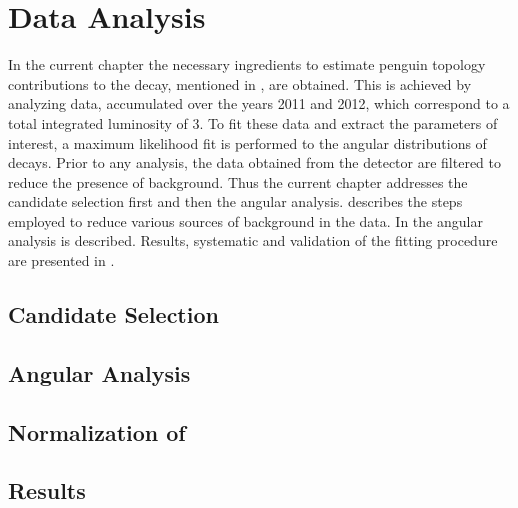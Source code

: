 \chapter{Data Analysis}
\label{Data_Analysis}

In the current chapter the necessary ingredients to estimate penguin topology contributions to the \BsJpsiPhi decay,
mentioned in , are obtained. This is achieved by analyzing \runone \lhcb data,
accumulated over the years 2011 and 2012, which correspond to a total integrated luminosity of 3\invfb.
To fit these data and extract the parameters of interest, a maximum likelihood fit is performed to the angular
distributions of \BsJpsiKst decays. Prior to any analysis, the data obtained from the detector are filtered
to reduce the presence of background. Thus the current chapter addresses the \Bs candidate selection first and
then the angular analysis.  describes the steps employed to reduce various sources of
background in the data. In  the angular analysis is described. Results, systematic and
validation of the fitting procedure are presented in .

\section{Candidate Selection}
\label{Event_Selection}


\section{Angular Analysis}
\label{Angular_Analysis}


\section{Normalization of \BsJpsiKpi}
\label{Normalization}


\section{Results}
\label{Results}

